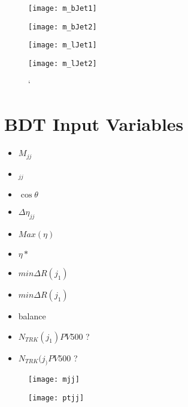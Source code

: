 				\begin{figure}[h]
					\centering
					
					\begin{minipage}[h]{0.33\linewidth}
						\texttt{[image: m\_bJet1]}
					\end{minipage}
					\quad
					\begin{minipage}[h]{0.33\linewidth}
						\texttt{[image: m\_bJet2]}
					\end{minipage}
					
					\begin{minipage}[h]{0.33\linewidth}
						\texttt{[image: m\_lJet1]}
					\end{minipage}
					\quad
					\begin{minipage}[h]{0.33\linewidth}
						\texttt{[image: m\_lJet2]}
					\end{minipage}`
					\label{fig:kin:m2c4j}
				\end{figure}
		


\section{BDT Input Variables}

	\begin{itemize}
		\item $M_{jj}$
		\item \pt$_{jj}$
		\item $\cos \theta$
		\item $\Delta\eta_{jj}$
		\item $Max(\eta)$
		\item $\eta*$
		\item $min\Delta R(j_1)$
		\item $min\Delta R(j_1)$
		\item \pt balance
		\item $N_{TRK}(j_1) PV500$ ?
		\item $N_{TRK}(j_) PV500$ ?
	\end{itemize}
	
		\begin{figure}[h]
			\begin{minipage}[h]{0.45\linewidth}
				\texttt{[image: mjj]}
				\caption{}
				\label{fig:bdtmjj}
			\end{minipage}
			\quad
			\begin{minipage}[h]{0.45\linewidth}
				\texttt{[image: ptjj]}
				\caption{}
				\label{fig:bdtptjj}
			\end{minipage}
		\end{figure}
		
